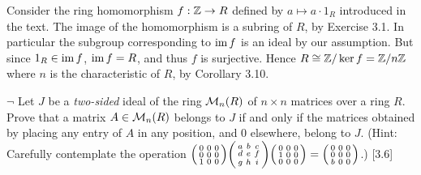 \begin{solution}
	Consider the ring homomorphism $f: \mathbb{Z} \to R$ defined by $a \mapsto a \cdot 1_R$ introduced in the text. The image of the homomorphism is a subring of $R$, by Exercise 3.1. In particular the subgroup corresponding to $\operatorname{im} f$ is an ideal by our assumption. But since $1_R \in \operatorname{im} f$, $\operatorname{im} f = R$, and thus $f$ is surjective. Hence $R \cong \mathbb{Z}/\ker f = \mathbb{Z}/n\mathbb{Z}$ where $n$ is the characteristic of $R$, by Corollary 3.10.
\end{solution}

\begin{problem}
	$\neg$ Let $J$ be a \emph{two-sided} ideal of the ring $\mathcal{M}_n(R)$ of $n \times n$ matrices over a ring $R$. Prove that a matrix $A \in \mathcal{M}_n(R)$ belongs to $J$ if and only if the matrices obtained by placing any entry of $A$ in any position, and $0$ elsewhere, belong to $J$. (Hint: Carefully contemplate the operation
	$\begin{psmallmatrix}
		0 & 0 & 0 \\
		0 & 0 & 0 \\
		1 & 0 & 0
	\end{psmallmatrix}
	\begin{psmallmatrix}
		a & b & c \\
		d & e & f \\
		g & h & i
	\end{psmallmatrix}
	\begin{psmallmatrix}
		0 & 0 & 0 \\
		1 & 0 & 0 \\
		0 & 0 & 0
	\end{psmallmatrix}
	= \begin{psmallmatrix}
		0 & 0 & 0 \\
		0 & 0 & 0 \\
		b & 0 & 0
	\end{psmallmatrix}$.) [3.6]
\end{problem}

